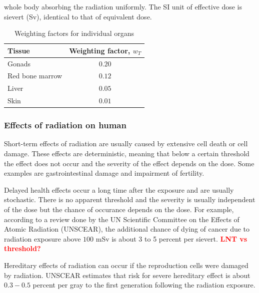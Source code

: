 \documentclass[preprint,aip,cha]{revtex4-1}
\newcommand{\red}[1]{\textcolor{red}{\bf #1}}
\begin{document}
        whole body absorbing the radiation uniformly. The SI unit of effective dose is sievert (Sv),
        identical to that of equivalent dose.
        \begin{table}
            \label{tab:eff}
            \centering
            \caption{Weighting factors for individual organs\cite{icrp74}}
            \begin{ruledtabular}
                \begin{tabular}{l c}
                Tissue & Weighting factor, $w_T$\\
                \hline
                Gonads & $0.20$\\
                Red bone marrow & $0.12$ \\
                Liver & $0.05$ \\
                Skin & $0.01$ \\
                \end{tabular}
            \end{ruledtabular}
        \end{table}
        \subsubsection{Effects of radiation on human}
        Short-term effects of radiation are usually caused by extensive cell death or cell damage.\cite{u16}
        These effects are deterministic, meaning that below a certain threshold the effect does not occur and
        the severity of the effect depends on the dose. Some examples are gastrointestinal damage and impairment
        of fertility.\cite{u16, l01}

        Delayed health effects occur a long time after the exposure and are usually stochastic. There is
        no apparent threshold and the severity is usually independent of the dose but
        the chance of occurance depends on the dose.\cite{u16,l01}
        For example, according to a review done by the UN Scientific Committee on the Effects of Atomic Radiation
        (UNSCEAR), the additional chance of dying of cancer due to radiation exposure above $100$ mSv is
        about 3 to 5 percent per sievert.\cite{unscear12}
        \red{LNT vs threshold?}

        Hereditary effects of radiation can occur if the reproduction cells were damaged by radiation.
        UNSCEAR estimates that risk for severe hereditary effect is about $0.3-0.5$ percent per gray to
        the first generation following the radiation exposure.\cite{u16, unscear12}
\end{document}
